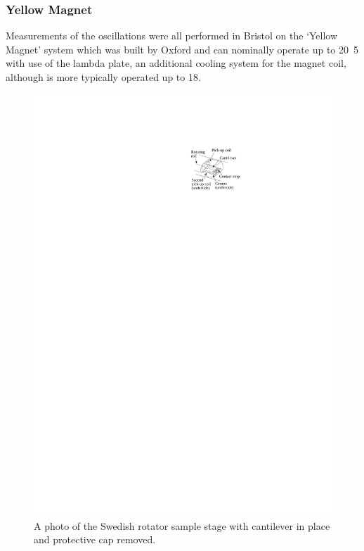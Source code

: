 
\subsubsection{Yellow Magnet}

Measurements of the oscillations were all performed in Bristol on the `Yellow Magnet' system which was built by Oxford and can nominally operate up to \unit{20.5}{\tesla} with use of the lambda plate, an additional cooling system for the magnet coil, although is more typically operated up to \unit{18}{\tesla}.
\begin{figure}[htbp]
    \begin{center}
        \includegraphics[scale=1.1]{Chapter-ExperimentalTechnique/Figures/SampleStageSchematic/SampleStageSchematic}
        \caption{A photo of the Swedish rotator sample stage with cantilever in place and protective cap removed.}
        \label{Fig:Exp:SampleStageSchematic}
    \end{center}
\end{figure}
